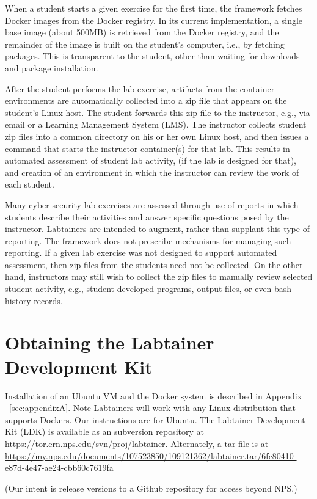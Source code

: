 \documentclass{article}
\begin{document}
When a student starts a given exercise for the first time, the framework fetches
Docker images from the Docker registry.  In its current implementation, a single
base image (about 500MB) is retrieved from the Docker registry, and the remainder of the image
is built on the student's computer, i.e., by fetching packages. This is transparent to
the student, other than waiting for downloads and package installation. 

After the student performs the lab exercise, artifacts from the container
environments are automatically collected into a zip file that appears on
the student's Linux host.  The student forwards this zip file to the instructor,
e.g., via email or a Learning Management System (LMS).  The instructor collects student zip files into a common
directory on his or her own Linux host, and then issues a command that starts
the instructor container(s) for that lab.  This results in automated assessment of student lab
activity, (if the lab is designed for that), and creation of an environment
in which the instructor can review the work of each student.

Many cyber security lab exercises are assessed through use of reports in which students
describe their activities and answer specific questions posed by the instructor.  Labtainers
are intended to augment, rather than supplant this type of reporting.  The framework does not
prescribe mechanisms for managing such reporting.  If a given lab exercise was not designed
to support automated assessment, then zip files from the students need not be collected.  On
the other hand, instructors may still wish to collect the zip files to manually review selected
student activity, e.g., student-developed programs, output files, or even bash history records.  

\section {Obtaining the Labtainer Development Kit}
Installation of an Ubuntu VM and the Docker system is described
in Appendix ~\ref{sec:appendixA}.  Note Labtainers will work with any Linux
distribution that supports Dockers.  Our instructions are for Ubuntu.
The Labtainer Development Kit (LDK) is available as an subversion repository at
\url{https://tor.ern.nps.edu/svn/proj/labtainer}.  Alternately, a tar file
is at 
\url{https://my.nps.edu/documents/107523850/109121362/labtainer.tar/6fc80410-e87d-4e47-ae24-cbb60c7619fa}

(Our intent is release versions to a Github repository for access beyond NPS.)
\end{document}
